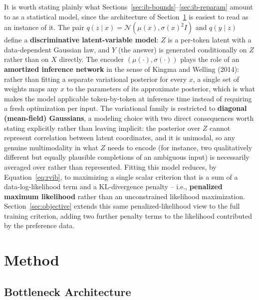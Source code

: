 \documentclass[11pt,a4paper,oneside]{article}
\begin{document}
It is worth stating plainly what Sections~\ref{sec:ib-bounds}--\ref{sec:ib-reparam} amount to as a
statistical model, since the architecture of Section~\ref{sec:method} is easiest to read as an
instance of it. The pair $q(z\mid x)=\mathcal N(\mu(x),\sigma(x)^2I)$ and $q(y\mid z)$ define a
\textbf{discriminative latent-variable model}: $Z$ is a per-token latent with a data-dependent
Gaussian law, and $Y$ (the answer) is generated conditionally on $Z$ rather than on $X$ directly. The
encoder $(\mu(\cdot),\sigma(\cdot))$ plays the role of an \textbf{amortized inference network} in the
sense of Kingma and Welling (2014): rather than fitting a separate variational posterior for every
$x$, a single set of weights maps any $x$ to the parameters of its approximate posterior, which is
what makes the model applicable token-by-token at inference time instead of requiring a fresh
optimization per input. The variational family is restricted to \textbf{diagonal (mean-field)
Gaussians}, a modeling choice with two direct consequences worth stating explicitly rather than
leaving implicit: the posterior over $Z$ cannot represent correlation between latent coordinates, and
it is unimodal, so any genuine multimodality in what $Z$ needs to encode (for instance, two
qualitatively different but equally plausible completions of an ambiguous input) is necessarily
averaged over rather than represented. Fitting this model reduces, by
Equation~\eqref{eq:rvib}, to maximizing a single scalar criterion that is a sum of a
data-log-likelihood term and a KL-divergence penalty -- i.e., \textbf{penalized maximum likelihood}
rather than an unconstrained likelihood maximization. Section~\ref{sec:objective} extends this same
penalized-likelihood view to the full training criterion, adding two further penalty terms to the
likelihood contributed by the preference data.

\clearpage
\section{Method}
\label{sec:method}

\subsection{Bottleneck Architecture}
\label{sec:arch}
\end{document}
